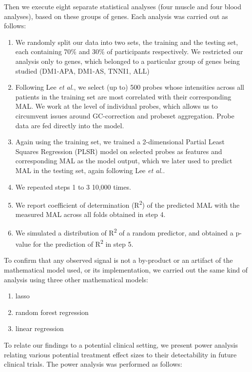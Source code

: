 \documentclass[10pt,letterpaper]{article}
\begin{document}
Then we execute eight separate statistical analyses (four muscle and four blood analyses), based on these groups of genes. Each analysis was carried out as follows:

\begin{enumerate}
\item We randomly split our data into two sets, the training and the testing set, each containing 70\% and 30\% of participants respectively. We restricted our analysis only to genes, which belonged to a particular group of genes being studied (DM1-APA, DM1-AS, TNNI1, ALL)
\item Following Lee {\it et al.}, we select (up to) 500 probes whose intensities across all patients in the training set are most correlated with their corresponding MAL. We work at the level of individual probes, which allows us to circumvent issues around GC-correction and probeset aggregation. Probe data are fed directly into the model.
\item Again using the training set, we trained a 2-dimensional Partial Least Squares Regression (PLSR) model on selected probes as features and corresponding MAL as the model output, which we later used to predict MAL in the testing set, again following Lee {\it et al.}.
\item We repeated steps 1 to 3 10,000 times.
\item We report coefficient of determination (R\textsuperscript{2}) of the predicted MAL with the measured MAL across all folds obtained in step 4.
\item We simulated a distribution of R\textsuperscript{2} of a random predictor, and obtained a p-value for the prediction of R\textsuperscript{2} in step 5.
\end{enumerate}

To confirm that any observed signal is not a by-product or an artifact of the mathematical model used, or its implementation, we carried out the same kind of analysis using three other mathematical models:

\begin{enumerate}
\item lasso
\item random forest regression
\item linear regression
\end{enumerate}

To relate our findings to a potential clinical setting, we present power analysis relating various potential treatment effect sizes to their detectability in future clinical trials. The power analysis was performed as follows:
\end{document}
